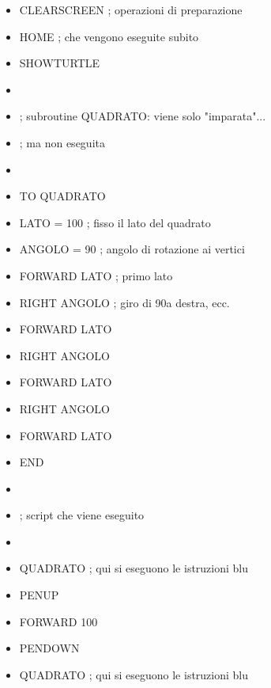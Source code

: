 \begin{scriptsize}
\begin{minipage}{0.50\textwidth}
\begin{itemize}[itemsep=-3pt,parsep=2pt, leftmargin=-6.0mm]
\item[] CLEARSCREEN	; operazioni di preparazione                    
\item[] HOME			; che vengono eseguite subito
\item[] SHOWTURTLE
\item[] 
\item[] ; subroutine QUADRATO: viene solo "imparata"...
\item[] 			        ; ma non eseguita
\item[] 
\item[] \color{green}TO \color{red}QUADRATO
\item[] 	\color{blue}LATO = 100	; fisso il lato del quadrato
\item[] 	ANGOLO = 90	; angolo di rotazione ai vertici
\item[] 	FORWARD LATO	; primo lato
\item[] 	RIGHT ANGOLO	; giro di 90\degree a destra, ecc.
\item[] 	FORWARD LATO
\item[] 	RIGHT ANGOLO
\item[] 	FORWARD LATO
\item[] 	RIGHT ANGOLO
\item[] 	FORWARD LATO
\item[] \color{green}END
\item[] 
\item[] \color{black}; script che viene eseguito
\item[] 
\item[] \color{red}QUADRATO\color{black}		; qui si eseguono le istruzioni blu
\item[] PENUP
\item[] FORWARD 100 
\item[] PENDOWN
\item[] \color{red}QUADRATO\color{black}		; qui si eseguono le istruzioni blu         
\end{itemize}
\end{minipage}
\end{scriptsize}
